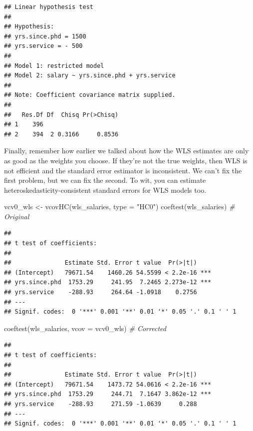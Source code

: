 \documentclass[
  12pt,
  oneside,openany]{book}
\newenvironment{Shaded}{\begin{snugshade}}{\end{snugshade}}
\newcommand{\AttributeTok}[1]{\textcolor[rgb]{0.77,0.63,0.00}{#1}}
\newcommand{\CommentTok}[1]{\textcolor[rgb]{0.56,0.35,0.01}{\textit{#1}}}
\newcommand{\FunctionTok}[1]{\textcolor[rgb]{0.00,0.00,0.00}{#1}}
\newcommand{\NormalTok}[1]{#1}
\newcommand{\OtherTok}[1]{\textcolor[rgb]{0.56,0.35,0.01}{#1}}
\newcommand{\StringTok}[1]{\textcolor[rgb]{0.31,0.60,0.02}{#1}}
\begin{document}
\begin{verbatim}
## Linear hypothesis test
## 
## Hypothesis:
## yrs.since.phd = 1500
## yrs.service = - 500
## 
## Model 1: restricted model
## Model 2: salary ~ yrs.since.phd + yrs.service
## 
## Note: Coefficient covariance matrix supplied.
## 
##   Res.Df Df  Chisq Pr(>Chisq)
## 1    396                     
## 2    394  2 0.3166     0.8536
\end{verbatim}

Finally, remember how earlier we talked about how the WLS estimates are only as good as the weights you choose. If they're not the true weights, then WLS is not efficient and the standard error estimator is inconsistent. We can't fix the first problem, but we can fix the second. To wit, you can estimate heteroskedasticity-consistent standard errors for WLS models too.

\begin{Shaded}
\begin{Highlighting}[]
\NormalTok{vcv0\_wls }\OtherTok{\textless{}{-}} \FunctionTok{vcovHC}\NormalTok{(wls\_salaries, }\AttributeTok{type =} \StringTok{"HC0"}\NormalTok{)}
\FunctionTok{coeftest}\NormalTok{(wls\_salaries)  }\CommentTok{\# Original}
\end{Highlighting}
\end{Shaded}

\begin{verbatim}
## 
## t test of coefficients:
## 
##               Estimate Std. Error t value  Pr(>|t|)    
## (Intercept)   79671.54    1460.26 54.5599 < 2.2e-16 ***
## yrs.since.phd  1753.29     241.95  7.2465 2.273e-12 ***
## yrs.service    -288.93     264.64 -1.0918    0.2756    
## ---
## Signif. codes:  0 '***' 0.001 '**' 0.01 '*' 0.05 '.' 0.1 ' ' 1
\end{verbatim}

\begin{Shaded}
\begin{Highlighting}[]
\FunctionTok{coeftest}\NormalTok{(wls\_salaries, }\AttributeTok{vcov =}\NormalTok{ vcv0\_wls)  }\CommentTok{\# Corrected}
\end{Highlighting}
\end{Shaded}

\begin{verbatim}
## 
## t test of coefficients:
## 
##               Estimate Std. Error t value  Pr(>|t|)    
## (Intercept)   79671.54    1473.72 54.0616 < 2.2e-16 ***
## yrs.since.phd  1753.29     244.71  7.1647 3.862e-12 ***
## yrs.service    -288.93     271.59 -1.0639     0.288    
## ---
## Signif. codes:  0 '***' 0.001 '**' 0.01 '*' 0.05 '.' 0.1 ' ' 1
\end{verbatim}
\end{document}
